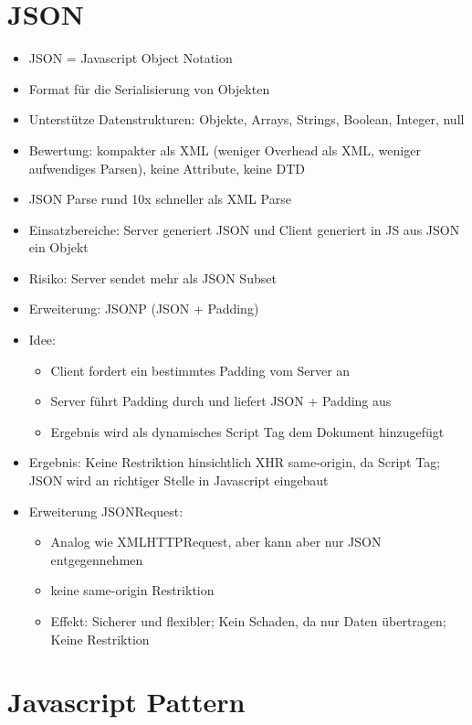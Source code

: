 \documentclass{article} %
\begin{document}
	
	
	\section{JSON}
	\begin{itemize}
		\item JSON = Javascript Object Notation
		\item Format für die Serialisierung von Objekten
		\item Unterstütze Datenstrukturen: Objekte, Arrays, Strings, Boolean, Integer, null
		\item Bewertung: kompakter als XML (weniger Overhead als XML, weniger aufwendiges Parsen), keine Attribute, keine DTD
		\item JSON Parse rund 10x schneller als XML Parse
		\item Einsatzbereiche: Server generiert JSON und Client generiert in JS aus JSON ein Objekt
		\item Risiko: Server sendet mehr als JSON Subset
		\item Erweiterung: JSONP (JSON + Padding)
		\item Idee: 
		\begin{itemize}
			\item Client fordert ein bestimmtes Padding vom Server an
			\item Server führt Padding durch und liefert JSON + Padding aus
			\item Ergebnis wird als dynamisches Script Tag dem Dokument hinzugefügt
		\end{itemize}
		\item Ergebnis: Keine Restriktion hinsichtlich XHR same-origin, da Script Tag; JSON wird an richtiger Stelle in Javascript eingebaut
		\item Erweiterung JSONRequest:
		\begin{itemize}
			\item Analog wie XMLHTTPRequest, aber kann aber nur JSON entgegennehmen
			\item keine same-origin Restriktion
			\item Effekt: Sicherer und flexibler; Kein Schaden, da nur Daten übertragen; Keine Restriktion
		\end{itemize}
	\end{itemize}
\section{Javascript Pattern}
\end{document}
